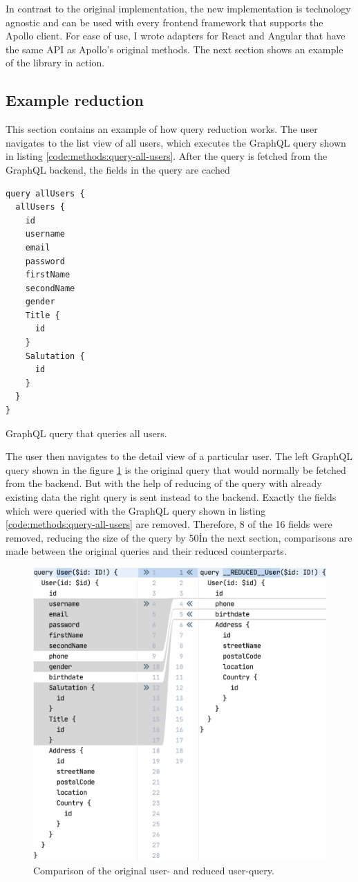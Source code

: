 In contrast to the original implementation, the new implementation is technology agnostic and can be used with every frontend framework that supports the Apollo client. For ease of use, I wrote adapters for React and Angular that have the same API as Apollo's original methods. The next section shows an example of the library in action.

\subsection{Example reduction}

This section contains an example of how query reduction works. The user navigates to the list view of all users, which executes the GraphQL query shown in listing \ref{code:methods:query-all-users}. After the query is fetched from the GraphQL backend, the fields in the query are cached

\ifshowListings
\begin{listing}[H]
\begin{verbatim}
query allUsers {
  allUsers {
    id
    username
    email
    password
    firstName
    secondName
    gender
    Title {
      id
    }
    Salutation {
      id
    }
  }
}
\end{verbatim}
\caption{GraphQL query that queries all users.}\label{code:methods:query-all-users}
\end{listing}
\fi

The user then navigates to the detail view of a particular user. The left GraphQL query shown in the figure \ref{figure:code:comparison-user-reduced-user} is the original query that would normally be fetched from the backend. But with the help of reducing of the query with already existing data the right query is sent instead to the backend. Exactly the fields which were queried with the GraphQL query shown in listing \ref{code:methods:query-all-users} are removed. Therefore, 8 of the 16 fields were removed, reducing the size of the query by 50\. In the next section, comparisons are made between the original queries and their reduced counterparts.

\ifshowImages
  \begin{figure}[H]
  \centering
  \includegraphics[width=0.6\linewidth]{images/reduction-graphql-examples/compare-user-reduced-user.png}
  \caption{Comparison of the original user- and reduced user-query.}\label{figure:code:comparison-user-reduced-user}
  \end{figure}
\fi

